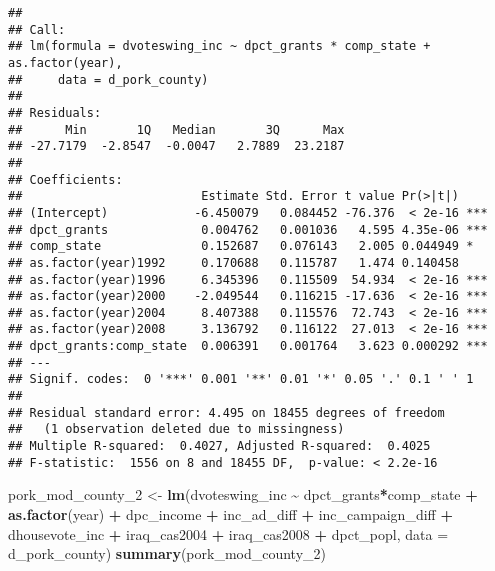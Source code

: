 \documentclass[
]{article}
\newenvironment{Shaded}{\begin{snugshade}}{\end{snugshade}}
\newcommand{\AttributeTok}[1]{\textcolor[rgb]{0.13,0.29,0.53}{#1}}
\newcommand{\FunctionTok}[1]{\textcolor[rgb]{0.13,0.29,0.53}{\textbf{#1}}}
\newcommand{\NormalTok}[1]{#1}
\newcommand{\OtherTok}[1]{\textcolor[rgb]{0.56,0.35,0.01}{#1}}
\newcommand{\SpecialCharTok}[1]{\textcolor[rgb]{0.81,0.36,0.00}{\textbf{#1}}}
\begin{document}
\begin{verbatim}
## 
## Call:
## lm(formula = dvoteswing_inc ~ dpct_grants * comp_state + as.factor(year), 
##     data = d_pork_county)
## 
## Residuals:
##      Min       1Q   Median       3Q      Max 
## -27.7179  -2.8547  -0.0047   2.7889  23.2187 
## 
## Coefficients:
##                         Estimate Std. Error t value Pr(>|t|)    
## (Intercept)            -6.450079   0.084452 -76.376  < 2e-16 ***
## dpct_grants             0.004762   0.001036   4.595 4.35e-06 ***
## comp_state              0.152687   0.076143   2.005 0.044949 *  
## as.factor(year)1992     0.170688   0.115787   1.474 0.140458    
## as.factor(year)1996     6.345396   0.115509  54.934  < 2e-16 ***
## as.factor(year)2000    -2.049544   0.116215 -17.636  < 2e-16 ***
## as.factor(year)2004     8.407388   0.115576  72.743  < 2e-16 ***
## as.factor(year)2008     3.136792   0.116122  27.013  < 2e-16 ***
## dpct_grants:comp_state  0.006391   0.001764   3.623 0.000292 ***
## ---
## Signif. codes:  0 '***' 0.001 '**' 0.01 '*' 0.05 '.' 0.1 ' ' 1
## 
## Residual standard error: 4.495 on 18455 degrees of freedom
##   (1 observation deleted due to missingness)
## Multiple R-squared:  0.4027, Adjusted R-squared:  0.4025 
## F-statistic:  1556 on 8 and 18455 DF,  p-value: < 2.2e-16
\end{verbatim}

\begin{Shaded}
\begin{Highlighting}[]
\NormalTok{pork\_mod\_county\_2 }\OtherTok{\textless{}{-}} \FunctionTok{lm}\NormalTok{(dvoteswing\_inc }\SpecialCharTok{\textasciitilde{}}\NormalTok{ dpct\_grants}\SpecialCharTok{*}\NormalTok{comp\_state }\SpecialCharTok{+} \FunctionTok{as.factor}\NormalTok{(year) }\SpecialCharTok{+}
\NormalTok{                          dpc\_income }\SpecialCharTok{+}\NormalTok{ inc\_ad\_diff }\SpecialCharTok{+}\NormalTok{ inc\_campaign\_diff }\SpecialCharTok{+} 
\NormalTok{                          dhousevote\_inc }\SpecialCharTok{+}\NormalTok{ iraq\_cas2004 }\SpecialCharTok{+}\NormalTok{ iraq\_cas2008 }\SpecialCharTok{+} 
\NormalTok{                          dpct\_popl,}
                        \AttributeTok{data =}\NormalTok{ d\_pork\_county)}
\FunctionTok{summary}\NormalTok{(pork\_mod\_county\_2)}
\end{Highlighting}
\end{Shaded}
\end{document}
